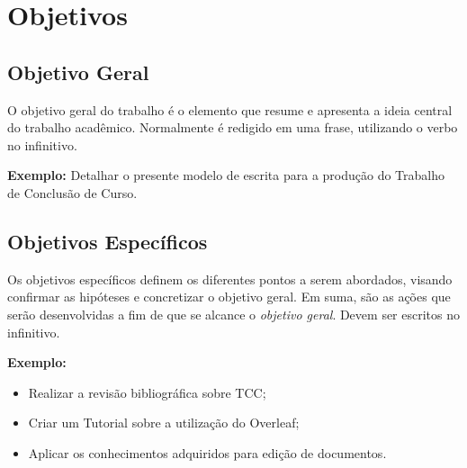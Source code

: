 \chapter{Objetivos}  \label{cap:02}



\section{Objetivo Geral}

O objetivo geral do trabalho é o elemento que resume e apresenta a ideia central do trabalho acadêmico. Normalmente é redigido em uma frase, utilizando o verbo no infinitivo. 

\textbf{Exemplo:} Detalhar o presente modelo de escrita para a produção do Trabalho de Conclusão de Curso.\\


\section{Objetivos Específicos}

Os objetivos específicos definem os diferentes pontos a serem abordados, visando confirmar as hipóteses e concretizar o objetivo geral. Em suma, são as ações que serão desenvolvidas a fim de que se alcance o \textit{objetivo geral}. Devem ser escritos no infinitivo.

\textbf{Exemplo:}

\begin{itemize}
    \item Realizar a revisão bibliográfica sobre TCC;
    \item Criar um Tutorial sobre a utilização do Overleaf;
    \item Aplicar os conhecimentos adquiridos para edição de documentos.
\end{itemize}